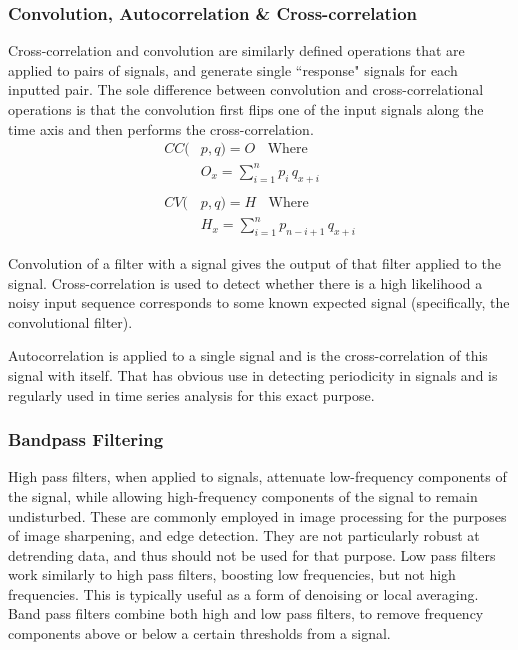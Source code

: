 \documentclass[9pt,conference]{IEEEtran}
\begin{document}
\subsubsection{Convolution, Autocorrelation \& Cross-correlation}
Cross-correlation and convolution are similarly defined operations that are applied to pairs of signals, and generate single ``response" signals for each inputted pair. The sole difference between convolution and cross-correlational operations is that the convolution first flips one of the input signals along the time axis and then performs the cross-correlation. 
\begin{align*}
            CC(&p,q) = O \;\;\text{ Where}\\
            &O_x = \sum_{i=1}^{n}p_i\, q_{x+i} \\
            &\\
            CV(&p,q) = H \;\;\text{ Where}\\
            &H_x = \sum_{i=1}^{n}p_{n-i+1}\, q_{x+i}
\end{align*}

Convolution of a filter with a signal gives the output of that filter applied to the signal. Cross-correlation is used to detect whether there is a high likelihood a noisy input sequence corresponds to some known expected signal (specifically, the convolutional filter).

Autocorrelation is applied to a single signal and is the cross-correlation of this signal with itself. That has obvious use in detecting periodicity in signals and is regularly used in time series analysis for this exact purpose.


\subsubsection{Bandpass Filtering}
High pass filters, when applied to signals, attenuate low-frequency components of the signal, while allowing high-frequency components of the signal to remain undisturbed. These are commonly employed in image processing for the purposes of image sharpening, and edge detection. They are not particularly robust at detrending data, and thus should not be used for that purpose. Low pass filters work similarly to high pass filters, boosting low frequencies, but not high frequencies. This is typically useful as a form of denoising or local averaging. Band pass filters combine both high and low pass filters, to remove frequency components above or below a certain thresholds from a signal.
\end{document}

